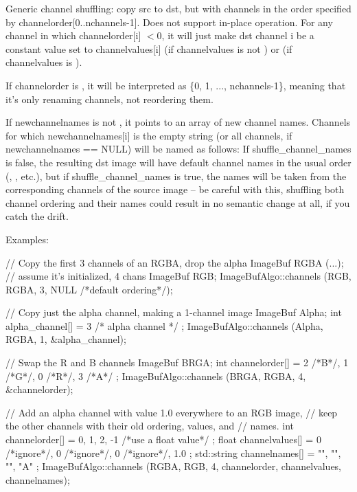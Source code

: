 Generic channel shuffling: copy {\cf src} to {\cf dst}, but with channels in
the order specified by {\cf channelorder[0..nchannels-1]}.  Does not support in-place
operation.  For any channel in which {\cf channelorder[i]} $< 0$, it will
just make {\cf dst} channel {\cf i} be a constant value set to {\cf channelvalues[i]}
(if {\cf channelvalues} is not \NULL) or {} (if {\cf channelvalues} is \NULL).

If {\cf channelorder} is \NULL, it will be interpreted as
{\cf \{0, 1, ..., nchannels-1\}}, meaning that it's only renaming channels,
not reordering them.

If {\cf newchannelnames} is not \NULL, it points to an array of new channel
names.  Channels for which {\cf newchannelnames[i]} is the empty string (or
all channels, if {\cf newchannelnames == NULL}) will be named as follows:
If {\cf shuffle_channel_names} is {\cf false}, the resulting dst image will have
default channel names in the usual order (, , etc.), but if
{\cf shuffle_channel_names} is {\cf true}, the names will be taken from the
corresponding channels of the source image -- be careful with this,
shuffling both channel ordering and their names could result in no
semantic change at all, if you catch the drift.

\smallskip
\noindent Examples:
\begin{code}
    // Copy the first 3 channels of an RGBA, drop the alpha
    ImageBuf RGBA (...);   // assume it's initialized, 4 chans
    ImageBuf RGB;
    ImageBufAlgo::channels (RGB, RGBA, 3, NULL /*default ordering*/);

    // Copy just the alpha channel, making a 1-channel image
    ImageBuf Alpha;
    int alpha_channel[] = { 3 /* alpha channel */ };
    ImageBufAlgo::channels (Alpha, RGBA, 1, &alpha_channel);

    // Swap the R and B channels
    ImageBuf BRGA;
    int channelorder[] = { 2 /*B*/, 1 /*G*/, 0 /*R*/, 3 /*A*/ };
    ImageBufAlgo::channels (BRGA, RGBA, 4, &channelorder);

    // Add an alpha channel with value 1.0 everywhere to an RGB image,
    // keep the other channels with their old ordering, values, and
    // names.
    int channelorder[] = { 0, 1, 2, -1 /*use a float value*/ };
    float channelvalues[] = { 0 /*ignore*/, 0 /*ignore*/, 0 /*ignore*/, 1.0 };
    std::string channelnames[] = { "", "", "", "A" };
    ImageBufAlgo::channels (RGBA, RGB, 4, channelorder,
                            channelvalues, channelnames);
\end{code}
\apiend

